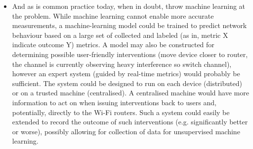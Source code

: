 \begin{itemize}
\item And as is common practice today, when in doubt, throw machine learning
at the problem. While machine learning cannot enable more accurate
measurements, a machine-learning model could be trained to predict network
behaviour based on a large set of collected and labeled (as in, metric X
indicate outcome Y) metrics. A model may also be constructed for determining
possible user-friendly interventions (move device closer to router, the
channel is currently observing heavy interference so switch channel), however
an expert system (guided by real-time metrics) would probably be sufficient.
The system could be designed to run on each device (distributed) or on a
trusted machine (centralised). A centralised machine would have more
information to act on when issuing interventions back to users and,
potentially, directly to the Wi-Fi routers. Such a system could easily be
extended to record the outcome of such interventions (e.g. significantly
better or worse), possibly allowing for collection of data for unsupervised
machine learning.

\end{itemize}
